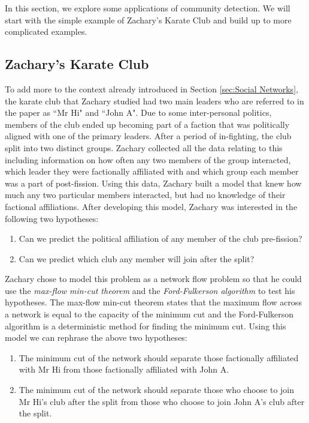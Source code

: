 In this section, we explore some applications of community detection. We will start with the simple example of Zachary's Karate Club and build up to more complicated examples.

\subsection{Zachary's Karate Club}\label{sec:zachary_section}
To add more to the context already introduced in Section \ref{sec:Social Networks}, the karate club that Zachary studied had two main leaders who are referred to in the paper as ``Mr Hi" and ``John A". Due to some inter-personal politics, members of the club ended up becoming part of a faction that was politically aligned with one of the primary leaders. After a period of in-fighting, the club split into two distinct groups. Zachary collected all the data relating to this including information on how often any two members of the group interacted, which leader they were factionally affiliated with and which group each member was a part of post-fission. Using this data, Zachary built a model that knew how much any two particular members interacted, but had no knowledge of their factional affiliations. After developing this model, Zachary was interested in the following two hypotheses:

\begin{enumerate}
    \item Can we predict the political affiliation of any member of the club pre-fission?
    \item Can we predict which club any member will join after the split?
\end{enumerate}

Zachary chose to model this problem as a network flow problem so that he could use the \emph{max-flow min-cut theorem} and the \emph{Ford-Fulkerson algorithm}\cite{ford_fulkerson_1956} to test his hypotheses. The max-flow min-cut theorem states that the maximum flow across a network is equal to the capacity of the minimum cut and the Ford-Fulkerson algorithm is a deterministic method for finding the minimum cut. Using this model we can rephrase the above two hypotheses:

\begin{enumerate}
    \item The minimum cut of the network should separate those factionally affiliated with Mr Hi from those factionally affiliated with John A.
    \item The minimum cut of the network should separate those who choose to join Mr Hi's club after the split from those who choose to join John A's club after the split.
\end{enumerate}

